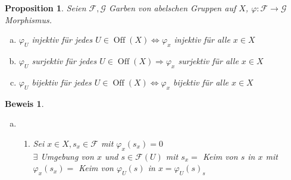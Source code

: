 \documentclass[paper = A4, fontsize=12pt, numbers=noendperiod, chapterprefix=true]{scrbook}
\theoremstyle{break}
\newtheorem{Prop}[Def]{Proposition}
\theoremstyle{nonumberbreak}
\newtheorem{bew}{Beweis}
\theoremstyle{nonumberplain}
\newcommand{\quot}[1]{\textrm{\glqq}{#1}\textrm{\grqq}}
\newenvironment{twosidedproof}{\begin{enumerate}[\quot{$\Rightarrow$}:]}{\end{enumerate}}
\newcommand{\proofforward}{\item[\quot{$\Rightarrow$}:]}
\DeclareMathOperator{\Off}{Off}
\newcommand{\calF}{\mathcal{F}}
\newcommand{\calG}{\mathcal{G}}
\begin{document}
\begin{Prop}\label{1.8}
Seien $\calF, \calG$ Garben von abelschen Gruppen auf $X$, $\varphi: \calF \to \calG$ Morphismus.
\begin{enumerate}[a)]
\item\label{1.8a}
  $\varphi_U$ injektiv f\"ur jedes $U\in \Off(X) \Leftrightarrow \varphi_x$ injektiv f\"ur alle $x\in X$
\item
  $\varphi_U$ surjektiv f\"ur jedes $U\in \Off(X) \Rightarrow \varphi_x$ surjektiv f\"ur alle $x\in X$
\item
  $\varphi_U$ bijektiv f\"ur jedes $U\in \Off(X) \Leftrightarrow \varphi_x$ bijektiv f\"ur alle $x\in X$
\end{enumerate}\end{Prop}

\begin{bew}\begin{enumerate}[a)]
\item
  \begin{twosidedproof}
  \proofforward
    Sei $x\in X, s_x\in \calF$ mit $\varphi_x(s_x)=0$\\
    $\exists$ Umgebung von $x$ und $s\in \calF(U)$ mit $s_x =$ Keim von $s$ in $x$ mit $\varphi_x(s_x)=$ Keim von $\varphi_U(s)$ in $x = \varphi_U(s)_s$
    \begin{center}
\end{center}
\end{twosidedproof}
\end{enumerate}
\end{bew}
\end{document}
